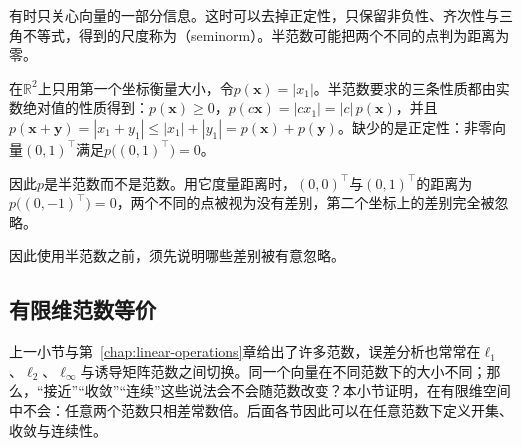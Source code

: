 有时只关心向量的一部分信息。这时可以去掉正定性，只保留非负性、齐次性与三角不等式，得到的尺度称为（seminorm）。半范数可能把两个不同的点判为距离为零。
\begin{example}[只看第一个坐标的半范数]
\label{ex:ls-seminorm-first-coordinate}
在$\mathbb R^2$上只用第一个坐标衡量大小，令$p(\bm x)=|x_1|$。半范数要求的三条性质都由实数绝对值的性质得到：$p(\bm x)\geq0$，$p(c\bm x)=|cx_1|=|c|\,p(\bm x)$，并且$p(\bm x+\bm y)=|x_1+y_1|\leq|x_1|+|y_1|=p(\bm x)+p(\bm y)$。缺少的是正定性：非零向量$(0,1)^\top$满足$p\bigl((0,1)^\top\bigr)=0$。

因此$p$是半范数而不是范数。用它度量距离时，$(0,0)^\top$与$(0,1)^\top$的距离为$p\bigl((0,-1)^\top\bigr)=0$，两个不同的点被视为没有差别，第二个坐标上的差别完全被忽略。
\end{example}
因此使用半范数之前，须先说明哪些差别被有意忽略。

\subsection{有限维范数等价}
\label{sec:multivariable-norm-equivalence}
\label{sec:linear-algebra-sequence-convergence}
\label{sec:ls-finite-dimensional-normed-properties}

上一小节与第~\ref{chap:linear-operations}章给出了许多范数，误差分析也常常在$\ell_1$、$\ell_2$、$\ell_\infty$与诱导矩阵范数之间切换。同一个向量在不同范数下的大小不同；那么，“接近”“收敛”“连续”这些说法会不会随范数改变？本小节证明，在有限维空间中不会：任意两个范数只相差常数倍。后面各节因此可以在任意范数下定义开集、收敛与连续性。

